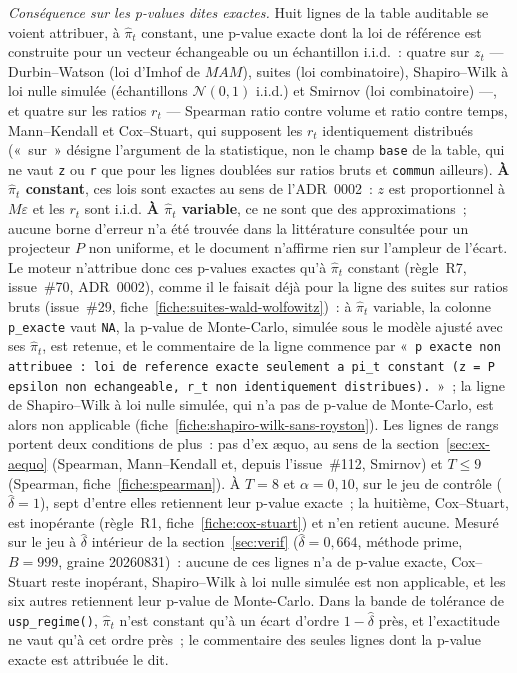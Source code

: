 \documentclass[a4paper,11pt]{article}
\newcommand{\code}[1]{\texttt{\small #1}}
\begin{document}
\emph{Conséquence sur les p-values dites exactes.} Huit lignes de la table auditable se voient
attribuer, à $\hat\pi_t$ constant, une p-value exacte dont la loi de référence est construite pour
un vecteur échangeable ou un échantillon i.i.d.~: quatre sur $z_t$ --- Durbin--Watson (loi d'Imhof de $MAM$), suites (loi
combinatoire), Shapiro--Wilk à loi nulle simulée (échantillons $\mathcal{N}(0,1)$ i.i.d.) et
Smirnov (loi combinatoire) ---, et quatre sur les ratios $r_t$ --- Spearman ratio contre volume
et ratio contre temps, Mann--Kendall et Cox--Stuart, qui supposent les $r_t$ identiquement
distribués («~sur~» désigne l'argument de la statistique, non le champ \code{base} de la table,
qui ne vaut \code{z} ou \code{r} que pour les lignes doublées sur ratios bruts et \code{commun}
ailleurs). \textbf{À $\hat\pi_t$ constant}, ces lois sont exactes au sens de l'ADR~0002~:
$z$ est proportionnel à $M\varepsilon$ et les $r_t$ sont i.i.d. \textbf{À $\hat\pi_t$
variable}, ce ne sont que des approximations~; aucune borne d'erreur n'a été trouvée dans la
littérature consultée pour un projecteur $P$ non uniforme, et le document n'affirme rien sur
l'ampleur de l'écart. Le moteur n'attribue donc ces p-values exactes qu'à $\hat\pi_t$ constant
(règle~R7, issue~\#70, ADR~0002), comme il le faisait déjà pour la ligne des suites sur ratios
bruts (issue~\#29, fiche~\ref{fiche:suites-wald-wolfowitz})~: à $\hat\pi_t$ variable, la colonne
\code{p\_exacte} vaut \code{NA}, la p-value de Monte-Carlo, simulée sous le modèle ajusté avec
ses $\hat\pi_t$, est retenue, et le commentaire de la ligne commence par
«~\code{p exacte non attribuee~: loi de reference exacte seulement a pi\_t constant (z = P
epsilon non echangeable, r\_t non identiquement distribues).}~»~; la ligne de Shapiro--Wilk à loi
nulle simulée, qui n'a pas de p-value de Monte-Carlo, est alors non applicable
(fiche~\ref{fiche:shapiro-wilk-sans-royston}). Les lignes de rangs portent deux conditions de plus~:
pas d'ex \ae quo, au sens de la section~\ref{sec:ex-aequo} (Spearman, Mann--Kendall et, depuis
l'issue~\#112, Smirnov) et $T \le 9$ (Spearman,
fiche~\ref{fiche:spearman}). À $T = 8$ et $\alpha = 0{,}10$, sur le jeu de contrôle
($\hat\delta = 1$), sept d'entre elles retiennent leur p-value exacte~; la huitième, Cox--Stuart,
est inopérante (règle~R1, fiche~\ref{fiche:cox-stuart}) et n'en retient aucune. Mesuré sur le jeu
à $\hat\delta$ intérieur de la section~\ref{sec:verif} ($\hat\delta = 0{,}664$, méthode prime,
$B = 999$, graine 20260831)~: aucune de ces lignes n'a de p-value exacte, Cox--Stuart reste
inopérant, Shapiro--Wilk à loi nulle simulée est non applicable, et les six autres retiennent leur
p-value de Monte-Carlo. Dans la bande de tolérance de \code{usp\_regime()}, $\hat\pi_t$ n'est
constant qu'à un écart d'ordre $1 - \hat\delta$ près, et l'exactitude ne vaut qu'à cet ordre
près~; le commentaire des seules lignes dont la p-value exacte est attribuée le dit.
\end{document}
